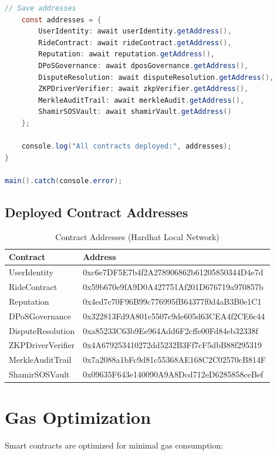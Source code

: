 \begin{lstlisting}[language=Java, caption=deploy.js]
    // Save addresses
    const addresses = {
        UserIdentity: await userIdentity.getAddress(),
        RideContract: await rideContract.getAddress(),
        Reputation: await reputation.getAddress(),
        DPoSGovernance: await dposGovernance.getAddress(),
        DisputeResolution: await disputeResolution.getAddress(),
        ZKPDriverVerifier: await zkpVerifier.getAddress(),
        MerkleAuditTrail: await merkleAudit.getAddress(),
        ShamirSOSVault: await shamirVault.getAddress()
    };
    
    console.log("All contracts deployed:", addresses);
}

main().catch(console.error);
\end{lstlisting}

\subsection{Deployed Contract Addresses}

\begin{table}[H]
\centering
\caption{Contract Addresses (Hardhat Local Network)}
\begin{tabular}{|l|l|}
\hline
\textbf{Contract} & \textbf{Address} \\
\hline
UserIdentity & 0xc6e7DF5E7b4f2A278906862b61205850344D4e7d \\
RideContract & 0x59b670e9fA9D0A427751Af201D676719a970857b \\
Reputation & 0x4ed7c70F96B99c776995fB64377f0d4aB3B0e1C1 \\
DPoSGovernance & 0x322813Fd9A801c5507c9de605d63CEA4f2CE6c44 \\
DisputeResolution & 0xa85233C63b9Ee964Add6F2cffe00Fd84eb32338f \\
ZKPDriverVerifier & 0x4A679253410272dd5232B3Ff7cF5dbB88f295319 \\
MerkleAuditTrail & 0x7a2088a1bFc9d81c55368AE168C2C02570cB814F \\
ShamirSOSVault & 0x09635F643e140090A9A8Dcd712eD6285858ceBef \\
\hline
\end{tabular}
\end{table}

\section{Gas Optimization}

Smart contracts are optimized for minimal gas consumption:

